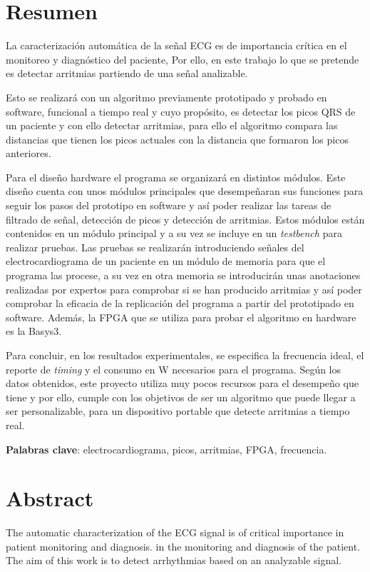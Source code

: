 \chapter*{Resumen}

La caracterización automática de la señal ECG es de importancia crítica
en el monitoreo y diagnóstico del paciente, Por ello, en este trabajo
lo que se pretende es detectar arritmias partiendo de una señal analizable. \cite{desai2021low}

Esto se realizará con un algoritmo previamente prototipado y probado en software, funcional a tiempo real y cuyo propósito, es detectar los picos QRS de un paciente y con ello detectar arritmias, para ello el algoritmo compara las distancias que tienen los picos actuales con la distancia que formaron los picos anteriores.

Para el diseño hardware el programa se organizará en distintos módulos. Este diseño cuenta con unos módulos principales que desempeñaran sus funciones para
seguir los pasos del prototipo en software y así poder realizar las tareas de filtrado de señal, detección de picos y detección de arritmias.
Estos módulos están contenidos en un módulo principal y a su vez se incluye en un \textit{testbench} para realizar pruebas. Las pruebas se realizarán introduciendo señales del electrocardiograma de un paciente en un módulo de memoria para que el programa las procese, a su vez en otra memoria se introducirán unas anotaciones realizadas por expertos para comprobar si se han producido arritmias y así poder comprobar la eficacia de la replicación del programa a partir del prototipado en software.  Además, la FPGA que se utiliza para probar el algoritmo en hardware es la Basys3.

Para concluir, en los resultados experimentales, se especifica la frecuencia ideal, el reporte de \textit{timing} y el consumo en W necesarios para el programa. Según los datos obtenidos, este proyecto utiliza muy pocos recursos para el desempeño que tiene y por ello, cumple con los objetivos de ser un algoritmo que puede llegar a ser personalizable, para un dispositivo portable que detecte arritmias a tiempo real.

\noindent\textbf{Palabras clave}: electrocardiograma, picos, arritmias, FPGA, frecuencia.

\chapter*{Abstract}

The automatic characterization of the ECG signal is of critical importance in patient monitoring and diagnosis.
in the monitoring and diagnosis of the patient.
The aim of this work is to detect arrhythmias based on an analyzable signal.

